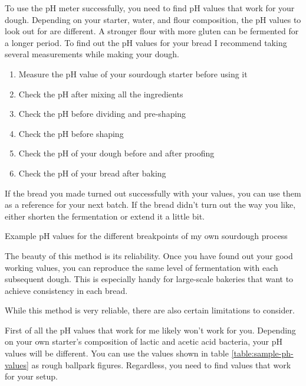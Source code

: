 To use the pH meter successfully, you need to find pH values
that work for your dough. Depending on your starter,
water, and flour composition, the pH values to look out
for are different. A stronger flour with more gluten
can be fermented for a longer period. To find out
the pH values for your bread I recommend taking
several measurements while making your dough.

\begin{enumerate}
  \item Measure the pH value of your sourdough starter before using it
  \item Check the pH after mixing all the ingredients
  \item Check the pH before dividing and pre-shaping
  \item Check the pH before shaping
  \item Check the pH of your dough before and after proofing
  \item Check the pH of your bread after baking
\end{enumerate}

If the bread you made turned out successfully with your values,
you can use them as a reference for your next batch. If the
bread didn't turn out the way you like, either shorten
the fermentation or extend it a little bit.

\begin{table}[!htb]
    \begin{center}
        
        \caption{Example pH values for the different breakpoints of my own sourdough process}
        \label{table:sample-ph-values}
    \end{center}
\end{table}

The beauty of this method is its reliability. Once you have found
out your good working values, you can reproduce
the same level of fermentation with each subsequent dough.
This is especially handy for large-scale bakeries that want
to achieve consistency in each bread.

While this method is very reliable, there are also certain
limitations to consider.

First of all the pH values that work for me likely won't work for
you. Depending on your own starter's composition of lactic
and acetic acid bacteria, your pH values will be different.
You can use the values shown in table \ref{table:sample-ph-values}
as rough ballpark figures. Regardless, you need to find values
that work for your setup.

